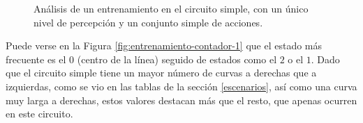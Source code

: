 \begin{figure}
    \begin{center}
        \hspace{0.1cm}
        \hspace{0.1cm}
    \end{center}
  \centering
  \captionsetup{justification=centering,margin=2cm}
  \caption{Análisis de un entrenamiento en el circuito simple, con un único nivel de percepción y un conjunto simple de acciones.}
  \label{fig:entrenamiento-1}
\end{figure}


Puede verse en la Figura \ref{fig:entrenamiento-contador-1} que el estado más frecuente es el $0$ (centro de la línea) seguido de estados como el $2$ o el $1$. Dado que el circuito simple tiene un mayor número de curvas a derechas que a izquierdas, como se vio en las tablas de la sección \ref{escenarios}, así como una curva muy larga a derechas, estos valores destacan más que el resto, que apenas ocurren en este circuito.\\

